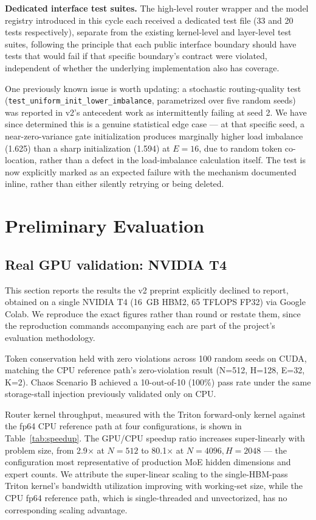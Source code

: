 \documentclass[11pt]{article}
\begin{document}
\textbf{Dedicated interface test suites.} The high-level router wrapper and
the model registry introduced in this cycle each received a dedicated test
file (33 and 20 tests respectively), separate from the existing kernel-level
and layer-level test suites, following the principle that each public
interface boundary should have tests that would fail if that specific
boundary's contract were violated, independent of whether the underlying
implementation also has coverage.

One previously known issue is worth updating: a stochastic routing-quality
test (\texttt{test\_uniform\_init\_lower\_imbalance}, parametrized over five
random seeds) was reported in v2's antecedent work as intermittently
failing at seed 2. We have since determined this is a genuine statistical
edge case --- at that specific seed, a near-zero-variance gate
initialization produces marginally higher load imbalance (1.625) than a
sharp initialization (1.594) at $E{=}16$, due to random token co-location,
rather than a defect in the load-imbalance calculation itself. The test is
now explicitly marked as an expected failure with the mechanism documented
inline, rather than either silently retrying or being deleted.

\section{Preliminary Evaluation}
\label{sec:eval}

\subsection{Real GPU validation: NVIDIA T4}

This section reports the results the v2 preprint explicitly declined to
report, obtained on a single NVIDIA T4 (16~GB HBM2, 65 TFLOPS FP32) via
Google Colab. We reproduce the exact figures rather than round or restate
them, since the reproduction commands accompanying each are part of the
project's evaluation methodology.

Token conservation held with zero violations across 100 random seeds on
CUDA, matching the CPU reference path's zero-violation result
(N=512, H=128, E=32, K=2). Chaos Scenario B achieved a 10-out-of-10 (100\%)
pass rate under the same storage-stall injection previously validated only
on CPU.

Router kernel throughput, measured with the Triton forward-only kernel
against the fp64 CPU reference path at four configurations, is shown in
Table~\ref{tab:speedup}. The GPU/CPU speedup ratio increases
super-linearly with problem size, from 2.9$\times$ at $N{=}512$ to
80.1$\times$ at $N{=}4096, H{=}2048$ --- the configuration most
representative of production MoE hidden dimensions and expert counts. We
attribute the super-linear scaling to the single-HBM-pass Triton kernel's
bandwidth utilization improving with working-set size, while the CPU fp64
reference path, which is single-threaded and unvectorized, has no
corresponding scaling advantage.
\end{document}
